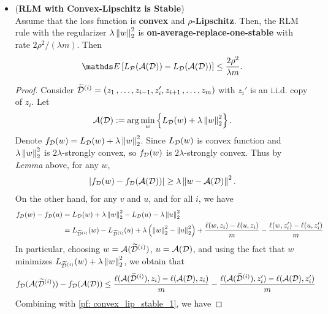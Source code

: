 \documentclass[11pt]{article}
\begin{document}
\begin{itemize}
\item \begin{corollary}(\textbf{RLM with Convex-Lipschitz is Stable}) \citep{shalev2014understanding}\\
Assume that the loss function is \textbf{convex} and \textbf{$\rho$-Lipschitz}. Then, the RLM rule with the regularizer $\lambda\left\|w\right\|_{2}^2$ is \textbf{on-average-replace-one-stable} with rate $2\rho^2/(\lambda m)$. Then
\begin{align}
\E{}{L_{\cP}(\cA(\cD)) - L_{\cD}(\cA(\cD)) } \le \frac{2\rho^2}{\lambda m}. \label{def: convex_lip_stable}
\end{align}
\end{corollary}
\begin{proof}
Consider $\widetilde{{\mathcal D}}^{(i)} = \left(z_1 \,{,}\ldots{,}\, z_{i-1},z_{i}', z_{i+1} \,{,}\ldots{,}\, z_m\right)$ with $z_i'$ is an i.i.d. copy of $z_i$. Let 
\begin{align*}
{\mathcal A}({\mathcal D}) := \arg\min_{w}\left\{ L_{{\mathcal D}}(w) + \lambda \left\|w\right\|_{2}^2\right\}.
\end{align*} Denote $f_{{\mathcal D}}(w) = L_{{\mathcal D}}(w) + \lambda \left\|w\right\|_{2}^2$. Since $L_{{\mathcal D}}(w)$ is convex function and $\lambda \left\|w\right\|_{2}^2$ is $2\lambda$-strongly convex, so $f_{{\mathcal D}}(w)$ is $2\lambda$-strongly convex. Thus by \emph{Lemma} above, for any $w$,
\begin{align}
\left\lvert f_{{\mathcal D}}(w) - f_{{\mathcal D}}({\mathcal A}({\mathcal D})) \right\rvert \ge \lambda \left\|w - {\mathcal A}({\mathcal D})\right\|_{}^2. \label{pf: convex_lip_stable_1}
\end{align}
 On the other hand, for any $v$ and $u$, and for all $i$, we have
\begin{align*}
f_{{\mathcal D}}(w) - f_{{\mathcal D}}(u) &= L_{{\mathcal D}}(w) + \lambda \left\|w\right\|_{2}^2 - L_{{\mathcal D}}(u) - \lambda \left\|u\right\|_{2}^2\\
&= L_{\widetilde{{\mathcal D}}^{(i)}}(w) -  L_{\widetilde{{\mathcal D}}^{(i)}}(u)  + \lambda \left(\left\|w\right\|_{2}^2 - \left\|u\right\|_{2}^2\right) + \frac{\ell(w, z_i) - \ell(u, z_i)}{m} - \frac{\ell(w, z_i') - \ell(u, z_i')}{m}
\end{align*} In particular, choosing $w = {\mathcal A}(\widetilde{{\mathcal D}}^{(i)})$, $u = {\mathcal A}({\mathcal D})$, and using the fact that $w$ minimizes
$L_{\widetilde{{\mathcal D}}^{(i)}}(w)+ \lambda \left\|w\right\|_{2}^2$, we obtain that
\begin{align}
f_{{\mathcal D}}({\mathcal A}(\widetilde{{\mathcal D}}^{(i)})) - f_{{\mathcal D}}( {\mathcal A}({\mathcal D})) &\le  \frac{\ell({\mathcal A}(\widetilde{{\mathcal D}}^{(i)}), z_i) - \ell({\mathcal A}({\mathcal D}), z_i)}{m} - \frac{\ell({\mathcal A}(\widetilde{{\mathcal D}}^{(i)}), z_i') - \ell({\mathcal A}({\mathcal D}), z_i')}{m} \label{pf: convex_lip_stable_2}
\end{align} Combining with \eqref{pf: convex_lip_stable_1}, we have

\end{proof}
\end{itemize}
\end{document}
